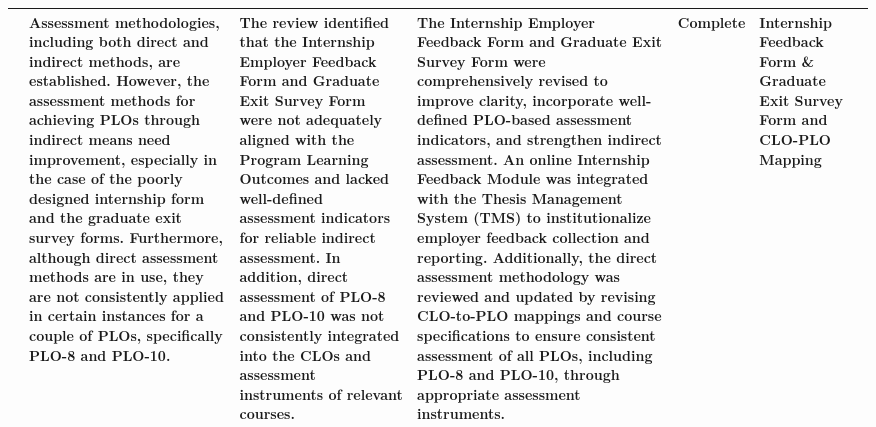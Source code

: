 \documentclass[10pt,a4paper]{article}
\begin{document}
\begin{longtable}{|P{2.3cm}|P{5.0cm}|P{4.5cm}|P{5.0cm}|P{2.4cm}|P{2.8cm}|P{1.8cm}|}
 & Assessment methodologies, including both direct and indirect methods, are established. However, the assessment methods for achieving PLOs through indirect means need improvement, especially in the case of the poorly designed internship form and the graduate exit survey forms. Furthermore, although direct assessment methods are in use, they are not consistently applied in certain instances for a couple of PLOs, specifically PLO-8 and PLO-10. & The review identified that the Internship Employer Feedback Form and Graduate Exit Survey Form were not adequately aligned with the Program Learning Outcomes and lacked well-defined assessment indicators for reliable indirect assessment. In addition, direct assessment of PLO-8 and PLO-10 was not consistently integrated into the CLOs and assessment instruments of relevant courses. & The Internship Employer Feedback Form and Graduate Exit Survey Form were comprehensively revised to improve clarity, incorporate well-defined PLO-based assessment indicators, and strengthen indirect assessment. An online Internship Feedback Module was integrated with the Thesis Management System (TMS) to institutionalize employer feedback collection and reporting. Additionally, the direct assessment methodology was reviewed and updated by revising CLO-to-PLO mappings and course specifications to ensure consistent assessment of all PLOs, including PLO-8 and PLO-10, through appropriate assessment instruments. & Complete & Internship Feedback Form \& Graduate Exit Survey Form and CLO-PLO Mapping &  \\ \hline

\end{longtable}
\end{document}
